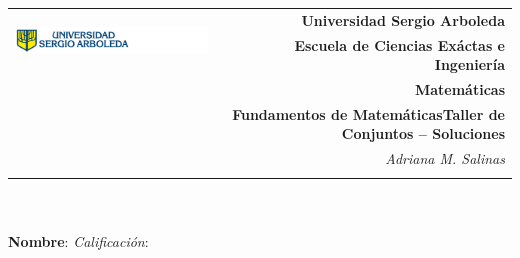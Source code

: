 \documentclass[12pt,letterpaper]{exam}
\newcommand{\base}[1]{\underline{\hspace{#1}}}
\newcommand{\uni}{Universidad Sergio Arboleda}
\newcommand{\fac}{\normalsize{Escuela de Ciencias Exáctas e Ingeniería}}
\newcommand{\dep}{Matemáticas}
\newcommand{\mat}{Fundamentos de Matem\'aticas}
\newcommand{\tema}{Taller de Conjuntos – Soluciones}
\newcommand{\autor}{Adriana M. Salinas}
\begin{document}
\begin{tabular}{lr}
    \multirow{2}{*}{\includegraphics[height=1.4cm]{logosergio.png}} &
    {\textbf{\uni}} \\
    & {\textbf{\fac}} \\
    & {\textbf{\dep}} \\
    & {\textbf{\mat \tema}} \\
    & {\textit{\autor}} \\
    & {\textit{}}
\end{tabular}\\
\base{19.5cm}\\
\textbf{Nombre}:  \quad 
\textit{Calificación}: \base{2cm} \\[6pt]
\end{document}

